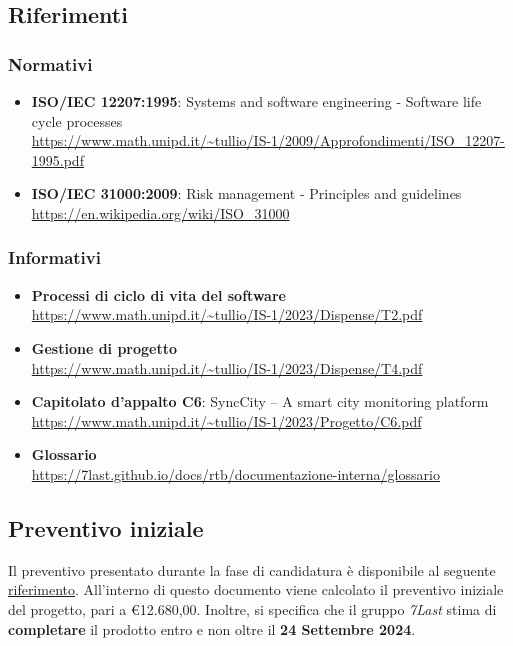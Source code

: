 \subsection{Riferimenti}
\subsubsection{Normativi} 
\begin{itemize}
	\item \textbf{ISO/IEC 12207:1995}: Systems and software engineering - Software life cycle processes \\\url{https://www.math.unipd.it/~tullio/IS-1/2009/Approfondimenti/ISO_12207-1995.pdf}
	\item \textbf{ISO/IEC 31000:2009}: Risk management - Principles and guidelines \\\url{https://en.wikipedia.org/wiki/ISO_31000}
\end{itemize}
\subsubsection{Informativi}
\begin{itemize}
	\item \textbf{Processi di ciclo di vita del software} \\
	      \url{https://www.math.unipd.it/~tullio/IS-1/2023/Dispense/T2.pdf}
	\item \textbf{Gestione di progetto} \\
	      \url{https://www.math.unipd.it/~tullio/IS-1/2023/Dispense/T4.pdf}
	\item \textbf{Capitolato d'appalto C6}: SyncCity – A smart city monitoring platform\\
	      \url{https://www.math.unipd.it/~tullio/IS-1/2023/Progetto/C6.pdf}
	\item \textbf{Glossario} \\
	      \url{https://7last.github.io/docs/rtb/documentazione-interna/glossario}
\end{itemize}

\subsection{Preventivo iniziale}
Il preventivo presentato durante la fase di candidatura è disponibile al seguente \uline{\href{https://7last.github.io/docs/candidatura/preventivo-costi-assunzione-impegni}{riferimento}}.
All'interno di questo documento viene calcolato il preventivo iniziale del progetto, pari a €12.680,00.
Inoltre, si specifica che il gruppo \textit{7Last} stima di \textbf{completare} il prodotto entro e non oltre il \textbf{24 Settembre 2024}.
